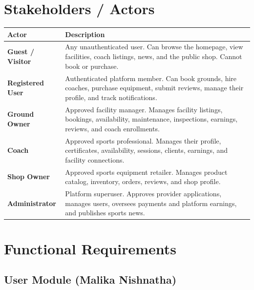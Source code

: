 \documentclass[12pt,a4paper]{report}
\begin{document}
\section{Stakeholders / Actors}

\begin{center}
\begin{tabular}{p{3.2cm} p{10.8cm}}
\toprule
\textbf{Actor} & \textbf{Description}\\
\midrule
\textbf{Guest / Visitor}  & Any unauthenticated user. Can browse the homepage, view facilities, coach listings, news, and the public shop. Cannot book or purchase.\\
\textbf{Registered User}  & Authenticated platform member. Can book grounds, hire coaches, purchase equipment, submit reviews, manage their profile, and track notifications.\\
\textbf{Ground Owner}     & Approved facility manager. Manages facility listings, bookings, availability, maintenance, inspections, earnings, reviews, and coach enrollments.\\
\textbf{Coach}            & Approved sports professional. Manages their profile, certificates, availability, sessions, clients, earnings, and facility connections.\\
\textbf{Shop Owner}       & Approved sports equipment retailer. Manages product catalog, inventory, orders, reviews, and shop profile.\\
\textbf{Administrator}    & Platform superuser. Approves provider applications, manages users, oversees payments and platform earnings, and publishes sports news.\\
\bottomrule
\end{tabular}
\end{center}

\section{Functional Requirements}

\subsection{User Module (Malika Nishnatha)}
\end{document}
